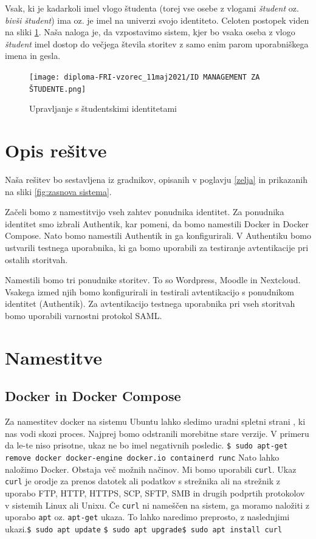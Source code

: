\documentclass[a4paper,12pt,openright,oneside]{book}
\begin{document}
Vsak, ki je kadarkoli imel vlogo študenta (torej vse osebe z vlogami \emph{študent} oz. \emph{bivši študent}) ima oz. je imel na univerzi svojo identiteto. 
Celoten postopek viden na sliki \ref{fig:student}. \newline Naša naloga je, da vzpostavimo sistem, kjer bo vsaka oseba z vlogo \emph{študent} imel dostop do večjega števila storitev z samo enim parom uporabniškega imena in gesla. 
\begin{figure}[H]
    \centering
    \texttt{[image: diploma-FRI-vzorec\_11maj2021/ID MANAGEMENT ZA ŠTUDENTE.png]}
    \caption{\label{fig:student} Upravljanje s študentskimi identitetami}
\end{figure}

\section{Opis rešitve}
Naša rešitev bo sestavljena iz gradnikov, opisanih v poglavju \ref{zelja} in prikazanih na sliki \ref{fig:zasnova sistema}.

Začeli bomo z namestitvijo vseh zahtev ponudnika identitet. Za ponudnika identitet smo izbrali Authentik, kar pomeni, da bomo namestili Docker in Docker Compose. Nato bomo namestili Authentik in ga konfigurirali. V Authentiku bomo ustvarili testnega uporabnika, ki ga bomo uporabili za testiranje avtentikacije pri ostalih storitvah. 

Namestili bomo tri ponudnike storitev. To so Wordpress, Moodle in Nextcloud. Vsakega izmed njih bomo konfigurirali in testirali avtentikacijo s ponudnikom identitet (Authentik). Za avtentikacijo testnega uporabnika pri vseh storitvah bomo uporabili varnostni protokol SAML. 

\section{Namestitve}
\subsection{Docker in Docker Compose}
Za namestitev docker na sistemu Ubuntu lahko sledimo uradni spletni strani \cite{DockerLink}, ki nas vodi skozi proces. Najprej bomo odstranili morebitne stare verzije. V primeru da le-te niso prisotne, ukaz ne bo imel negativnih posledic.\newline
\texttt{\$ sudo apt-get remove docker docker-engine docker.io containerd runc}
Nato lahko naložimo Docker. Obstaja več možnih načinov. Mi bomo uporabili \texttt{curl}.
Ukaz \texttt{curl} je orodje za prenos datotek ali podatkov s strežnika ali na strežnik z uporabo FTP, HTTP, HTTPS, SCP, SFTP, SMB in drugih podprtih protokolov v sistemih Linux ali Unixu. Če \texttt{curl} ni nameščen na sistem, ga moramo naložiti z uporabo \texttt{apt} oz. \texttt{apt-get} ukaza. To lahko naredimo preprosto, z naslednjimi ukazi.\newline\texttt{\$ sudo apt update}
\newline\texttt{\$ sudo apt upgrade}\newline\texttt{\$ sudo apt install curl}
\end{document}
